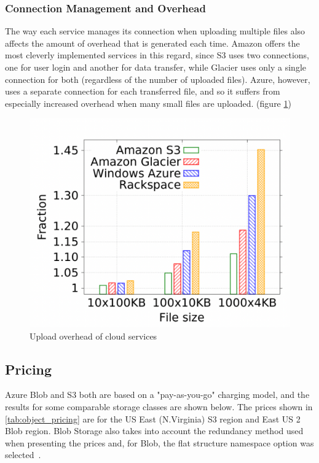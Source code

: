 \subsubsection{Connection Management and Overhead}
The way each service manages its connection when uploading multiple files also affects the amount of overhead that is generated each time. Amazon offers the most cleverly implemented services in this regard, since S3 uses two connections, one for user login and another for data transfer, while Glacier uses only a single connection for both (regardless of the number of uploaded files). Azure, however, uses a separate connection for each transferred file, and so it suffers from especially increased overhead when many small files are uploaded. (figure \ref{fig:overhead})

\begin{figure} [h]
    \centering
    \includegraphics[scale=0.3]{images/overhead}
    \caption{\label{fig:overhead}Upload overhead of cloud services}
\end{figure}

\subsection{Pricing}
Azure Blob and S3 both are based on a "pay-as-you-go" charging model,  and the results for some comparable storage classes are shown below. The prices shown in \ref{tab:object_pricing} are for the US East (N.Virginia) S3 region and East US 2 Blob region. Blob Storage also takes into account the redundancy method used when presenting the prices and, for Blob, the flat structure namespace option was selected~\cite{s3_pricing,blob_pricing}.

